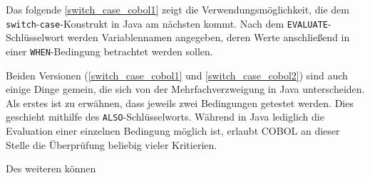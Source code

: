 Das folgende \autoref{switch_case_cobol1} zeigt die Verwendungsmöglichkeit, die dem \texttt{switch}-\texttt{case}-Konstrukt in Java am nächsten kommt. Nach dem \texttt{EVALUATE}-Schlüsselwort werden Variablennamen angegeben, deren Werte anschließend in einer \texttt{WHEN}-Bedingung betrachtet werden sollen.\\


Beiden Versionen (\autoref{switch_case_cobol1} und \autoref{switch_case_cobol2}) sind auch einige Dinge gemein, die sich von der Mehrfachverzweigung in Java unterscheiden.\\

Als erstes ist zu erwähnen, dass jeweils zwei Bedingungen getestet werden. Dies geschieht mithilfe des \texttt{ALSO}-Schlüsselworts. Während in Java lediglich die Evaluation einer einzelnen Bedingung möglich ist, erlaubt COBOL an dieser Stelle die Überprüfung beliebig vieler Kritierien.

Des weiteren können 

